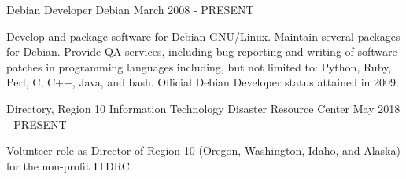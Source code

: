 
\begin{cventries}
  \cventry
    {Debian Developer} %
    {Debian} %
    {March 2008 - PRESENT} %
    {
      \begin{cvitems} %
        {Develop and package software for Debian GNU/Linux. Maintain several packages for Debian.
        Provide QA services, including bug reporting and writing of software patches in programming
        languages including, but not limited to: Python, Ruby, Perl, C, C++, Java, and bash. Official
        Debian Developer status attained in 2009.}
      \end{cvitems}
    }

  \cventry
    {Directory, Region 10} %
    {Information Technology Disaster Resource Center} %
    {May 2018 - PRESENT} %
    {
      \begin{cvitems} %
        {Volunteer role as Director of Region 10 (Oregon, Washington, Idaho, and Alaska) for the non-profit ITDRC.}
      \end{cvitems}
    }
\end{cventries}
